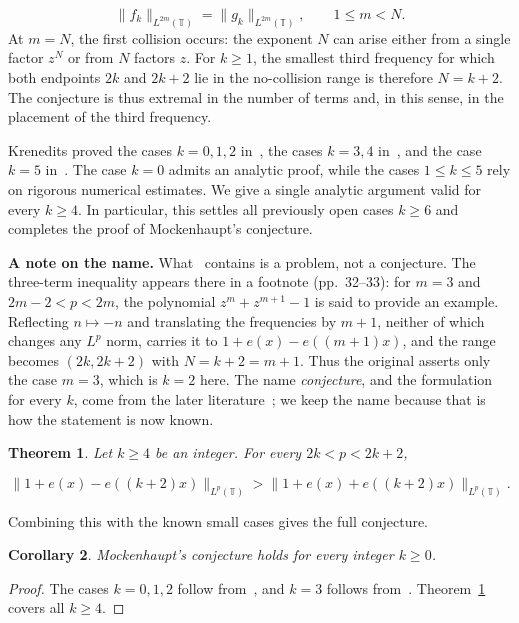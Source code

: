 \documentclass[11pt]{article}
\theoremstyle{plain}
\newtheorem{theorem}{Theorem}[section]
\newtheorem{corollary}[theorem]{Corollary}
\theoremstyle{definition}
\theoremstyle{remark}
\begin{document}
\[
  \|f_k\|_{L^{2m}(\mathbb{T})} = \|g_k\|_{L^{2m}(\mathbb{T})} , \qquad  1 \le m < N .
\]
At $m = N$, the first collision occurs: the exponent $N$ can arise either from a single factor $z^N$ or from $N$ factors $z$. For $k \ge 1$, the smallest third frequency for which both endpoints $2k$ and $2k+2$ lie in the no-collision range is therefore $N = k+2$. The conjecture is thus extremal in the number of terms and, in this sense, in the placement of the third frequency.

Krenedits proved the cases $k = 0,1,2$ in~\cite{r4}, the cases $k = 3,4$ in~\cite{r5}, and the case $k = 5$ in~\cite{r6}. The case $k = 0$ admits an analytic proof, while the cases $1 \le k \le 5$ rely on rigorous numerical estimates. We give a single analytic argument valid for every $k \ge 4$. In particular, this settles all previously open cases $k \ge 6$ and completes the proof of Mockenhaupt's conjecture.

\textbf{A note on the name.} What~\cite{r9} contains is a problem, not a conjecture. The three-term inequality appears there in a footnote (pp.~32--33): for $m = 3$ and $2m-2 < p < 2m$, the polynomial $z^m + z^{m+1} - 1$ is said to provide an example. Reflecting $n \mapsto -n$ and translating the frequencies by $m+1$, neither of which changes any $L^p$ norm, carries it to $1 + e(x) - e((m+1)x)$, and the range becomes $(2k, 2k+2)$ with $N = k+2 = m+1$. Thus the original asserts only the case $m = 3$, which is $k = 2$ here. The name \emph{conjecture}, and the formulation for every $k$, come from the later literature~\cite{r4,r5,r6}; we keep the name because that is how the statement is now known.

\begin{theorem}\label{res:1.1}
Let $k \ge 4$ be an integer. For every $2k < p < 2k+2$,

\[
  \|1 + e(x) - e((k+2)x)\|_{L^p(\mathbb{T})} > \|1 + e(x) + e((k+2)x)\|_{L^p(\mathbb{T})} .
\]
\end{theorem}
Combining this with the known small cases gives the full conjecture.

\begin{corollary}\label{res:1.2}
Mockenhaupt's conjecture holds for every integer $k \ge 0$.
\end{corollary}

\begin{proof}
The cases $k = 0,1,2$ follow from~\cite{r4}, and $k = 3$ follows from~\cite{r5}. Theorem~\ref{res:1.1} covers all $k \ge 4$.
\end{proof}
\end{document}
